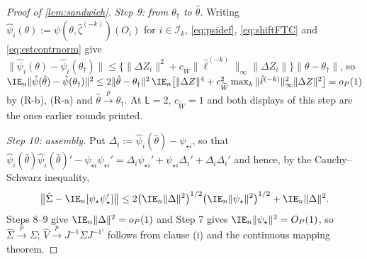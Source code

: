 \begin{proof}[Proof of \cref{lem:sandwich}]
\emph{Step 9: from $\theta_\dagger$ to $\hat\theta$.} Writing
$\hat\psi_i(\theta):=\psi(\theta,\hat\zeta^{(-k)})(O_i)$ for $i\in\mathcal I_k$, \eqref{eq:psidef},
\eqref{eq:shiftFTC} and \eqref{eq:estcontrnorm} give
$\|\hat\psi_i(\theta)-\hat\psi_i(\theta_\dagger)\|\le\{\|\Delta Z_i\|^{2}+c_{\widetilde W}\|\hat\ell^{(-k)}\|_\infty\|\Delta Z_i\|\}\|\theta-\theta_\dagger\|$,
so
$\IE_n\|\hat\psi(\hat\theta)-\hat\psi(\theta_\dagger)\|^{2}\le2\|\hat\theta-\theta_\dagger\|^{2}\,
\IE_n\big[\|\Delta Z\|^{4}+c_{\widetilde W}^{2}\max_k\|\hat\ell^{(-k)}\|^{2}_\infty\|\Delta Z\|^{2}\big]=o_P(1)$
by (R-b), (R-a) and $\hat\theta\xrightarrow{p}\theta_\dagger$. At $\mathsf L=2$,
$c_{\widetilde W}=1$ and both displays of this step are the ones earlier rounds printed.

\emph{Step 10: assembly.} Put $\Delta_i:=\hat\psi_i(\hat\theta)-\psi_{\star i}$, so that
$\hat\psi_i(\hat\theta)\hat\psi_i(\hat\theta)'-\psi_{\star i}\psi_{\star i}'=\Delta_i\psi_{\star i}'+\psi_{\star i}\Delta_i'+\Delta_i\Delta_i'$
and hence, by the Cauchy--Schwarz inequality,
\[
\big\|\hat\Sigma-\IE_n[\psi_\star\psi_\star']\big\|
\le2\big(\IE_n\|\Delta\|^{2}\big)^{1/2}\big(\IE_n\|\psi_\star\|^{2}\big)^{1/2}+\IE_n\|\Delta\|^{2}.
\]
Steps 8--9 give $\IE_n\|\Delta\|^{2}=o_P(1)$ and Step 7 gives $\IE_n\|\psi_\star\|^{2}=O_P(1)$, so
$\hat\Sigma\xrightarrow{p}\Sigma$; $\hat V\xrightarrow{p}J^{-1}\Sigma J^{-1\prime}$ follows from clause (i)
and the continuous mapping theorem.
\end{proof}

